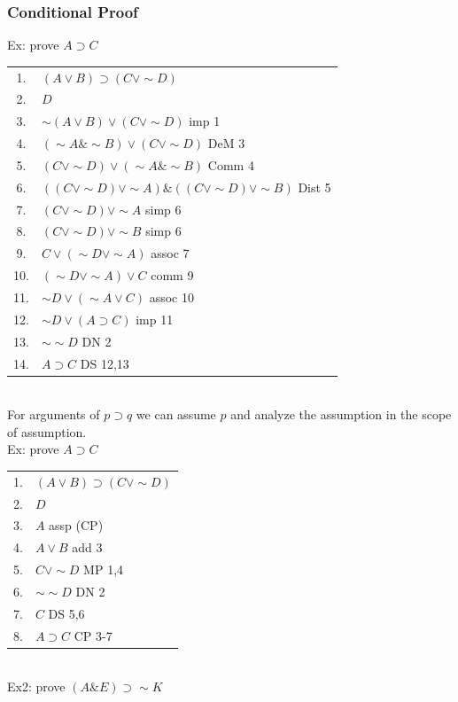 \documentclass[11pt, fleqn]{article}
\begin{document}
\subsubsection{Conditional Proof}
Ex: prove $A\supset C$\\
\begin{tabular}{cl}
    1. & $(A\vee B)\supset(C\vee \sim D)$\\
    2. & $D$\\
    \hline
    3. & $\sim(A\vee B)\vee(C\vee \sim D)$ imp 1\\
    4. & $(\sim A\&\sim B)\vee(C\vee \sim D)$ DeM 3\\
    5. & $(C\vee \sim D)\vee(\sim A\&\sim B)$ Comm 4\\
    6. & $((C\vee \sim D)\vee \sim A)\&((C\vee \sim D)\vee \sim B)$ Dist 5\\
    7. & $(C\vee \sim D)\vee \sim A$ simp 6\\
    8. & $(C\vee \sim D)\vee \sim B$ simp 6\\
    9. & $C\vee (\sim D\vee\sim A)$ assoc 7\\
    10. & $(\sim D\vee\sim A)\vee C$ comm 9\\
    11. & $\sim D\vee(\sim A\vee C)$ assoc 10\\
    12. & $\sim D\vee(A\supset C)$ imp 11\\
    13. & $\sim\sim D$ DN 2\\
    14. & $A\supset C$ DS 12,13
\end{tabular}\\
For arguments of $p\supset q$ we can assume $p$ and analyze the assumption in the scope of assumption.\\
Ex: prove $A\supset C$\\
\begin{tabular}{cl}
    1. & $(A\vee B)\supset(C\vee \sim D)$\\
    2. & $D$\\
    \hline
    3. & $A$ assp (CP)\\
    4. & $A\vee B$ add 3\\
    5. & $C\vee\sim D$ MP 1,4\\
    6. & $\sim\sim D$ DN 2\\
    7. & $C$ DS 5,6\\
    8. & $A\supset C$ CP 3-7
\end{tabular}\\
Ex2: prove $(A\& E)\supset \sim K$\\
\end{document}
